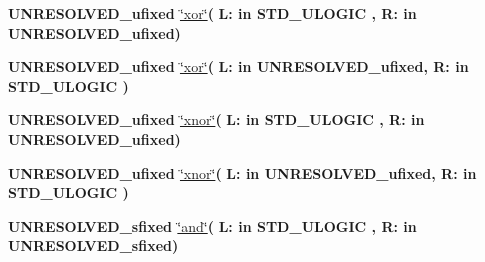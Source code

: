 \begin{DoxyCompactItemize}
\item 
{\bfseries {\bfseries \textcolor{vhdlchar}{U\+N\+R\+E\+S\+O\+L\+V\+E\+D\+\_\+ufixed}\textcolor{vhdlchar}{ }}} \hyperlink{class__fixed__pkg_a19fb968617591574247e67ab2aacc547}{\char`\"{}xor\char`\"{}}{\bfseries  ( }{\bfseries \textcolor{vhdlchar}{L\+: }\textcolor{stringliteral}{in }{\bfseries \textcolor{comment}{S\+T\+D\+\_\+\+U\+L\+O\+G\+I\+C}\textcolor{vhdlchar}{ }}}{\bfseries  , \textcolor{vhdlchar}{R\+: }\textcolor{stringliteral}{in }\textcolor{vhdlchar}{U\+N\+R\+E\+S\+O\+L\+V\+E\+D\+\_\+ufixed}}{\bfseries  )} 
\item 
{\bfseries {\bfseries \textcolor{vhdlchar}{U\+N\+R\+E\+S\+O\+L\+V\+E\+D\+\_\+ufixed}\textcolor{vhdlchar}{ }}} \hyperlink{class__fixed__pkg_a19fb968617591574247e67ab2aacc547}{\char`\"{}xor\char`\"{}}{\bfseries  ( }{\bfseries \textcolor{vhdlchar}{L\+: }\textcolor{stringliteral}{in }\textcolor{vhdlchar}{U\+N\+R\+E\+S\+O\+L\+V\+E\+D\+\_\+ufixed}}{\bfseries  , \textcolor{vhdlchar}{R\+: }\textcolor{stringliteral}{in }{\bfseries \textcolor{comment}{S\+T\+D\+\_\+\+U\+L\+O\+G\+I\+C}\textcolor{vhdlchar}{ }}}{\bfseries  )} 
\item 
{\bfseries {\bfseries \textcolor{vhdlchar}{U\+N\+R\+E\+S\+O\+L\+V\+E\+D\+\_\+ufixed}\textcolor{vhdlchar}{ }}} \hyperlink{class__fixed__pkg_aecb140bb5397d5cdc3a49e6e85882535}{\char`\"{}xnor\char`\"{}}{\bfseries  ( }{\bfseries \textcolor{vhdlchar}{L\+: }\textcolor{stringliteral}{in }{\bfseries \textcolor{comment}{S\+T\+D\+\_\+\+U\+L\+O\+G\+I\+C}\textcolor{vhdlchar}{ }}}{\bfseries  , \textcolor{vhdlchar}{R\+: }\textcolor{stringliteral}{in }\textcolor{vhdlchar}{U\+N\+R\+E\+S\+O\+L\+V\+E\+D\+\_\+ufixed}}{\bfseries  )} 
\item 
{\bfseries {\bfseries \textcolor{vhdlchar}{U\+N\+R\+E\+S\+O\+L\+V\+E\+D\+\_\+ufixed}\textcolor{vhdlchar}{ }}} \hyperlink{class__fixed__pkg_aecb140bb5397d5cdc3a49e6e85882535}{\char`\"{}xnor\char`\"{}}{\bfseries  ( }{\bfseries \textcolor{vhdlchar}{L\+: }\textcolor{stringliteral}{in }\textcolor{vhdlchar}{U\+N\+R\+E\+S\+O\+L\+V\+E\+D\+\_\+ufixed}}{\bfseries  , \textcolor{vhdlchar}{R\+: }\textcolor{stringliteral}{in }{\bfseries \textcolor{comment}{S\+T\+D\+\_\+\+U\+L\+O\+G\+I\+C}\textcolor{vhdlchar}{ }}}{\bfseries  )} 
\item 
{\bfseries {\bfseries \textcolor{vhdlchar}{U\+N\+R\+E\+S\+O\+L\+V\+E\+D\+\_\+sfixed}\textcolor{vhdlchar}{ }}} \hyperlink{class__fixed__pkg_a0033f7130cf6aa9248718b3eb3a675e5}{\char`\"{}and\char`\"{}}{\bfseries  ( }{\bfseries \textcolor{vhdlchar}{L\+: }\textcolor{stringliteral}{in }{\bfseries \textcolor{comment}{S\+T\+D\+\_\+\+U\+L\+O\+G\+I\+C}\textcolor{vhdlchar}{ }}}{\bfseries  , \textcolor{vhdlchar}{R\+: }\textcolor{stringliteral}{in }\textcolor{vhdlchar}{U\+N\+R\+E\+S\+O\+L\+V\+E\+D\+\_\+sfixed}}{\bfseries  )} 

\end{DoxyCompactItemize}

